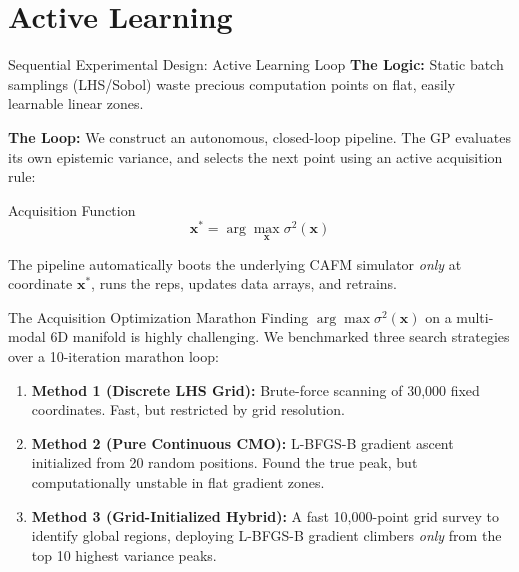 \documentclass[aspectratio=169]{beamer}
\begin{document}
\section{Active Learning}

\begin{frame}{Sequential Experimental Design: Active Learning Loop}
    \textbf{The Logic:} Static batch samplings (LHS/Sobol) waste precious computation points on flat, easily learnable linear zones.

    \vspace{0.3cm}
    \textbf{The Loop:} We construct an autonomous, closed-loop pipeline. The GP evaluates its own epistemic variance, and selects the next point using an active acquisition rule:
    
    \begin{block}{Acquisition Function}
    \[
    \mathbf{x}^* = \arg\max_{\mathbf{x}} \sigma^2(\mathbf{x})
    \]
    \end{block}

    \vspace{0.2cm}
    The pipeline automatically boots the underlying CAFM simulator \textit{only} at coordinate $\mathbf{x}^*$, runs the reps, updates data arrays, and retrains.
\end{frame}

\begin{frame}{The Acquisition Optimization Marathon}
    Finding $\arg\max \sigma^2(\mathbf{x})$ on a multi-modal 6D manifold is highly challenging. We benchmarked three search strategies over a 10-iteration marathon loop:
    
    \vspace{0.3cm}
    \begin{enumerate}
        \item \textbf{Method 1 (Discrete LHS Grid):} Brute-force scanning of 30,000 fixed coordinates. Fast, but restricted by grid resolution.
        \item \textbf{Method 2 (Pure Continuous CMO):} L-BFGS-B gradient ascent initialized from 20 random positions. Found the true peak, but computationally unstable in flat gradient zones.
        \item \textbf{Method 3 (Grid-Initialized Hybrid):} A fast 10,000-point grid survey to identify global regions, deploying L-BFGS-B gradient climbers \textit{only} from the top 10 highest variance peaks.
    \end{enumerate}
\end{frame}
\end{document}
